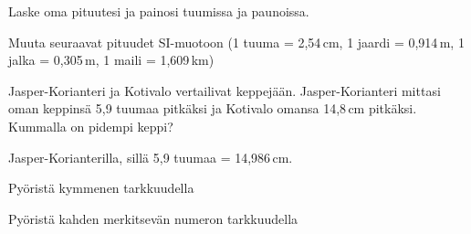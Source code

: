 \begin{tehtavasivu}
\begin{tehtava}
Laske oma pituutesi ja painosi tuumissa ja paunoissa.
\end{tehtava}

\begin{tehtava}
Muuta seuraavat pituudet SI-muotoon (1 tuuma = 2,54\,cm, 1 jaardi = 0,914\,m, 1 jalka = 0,305\,m, 1 maili = 1,609\,km) \\
\begin{alakohdat}
\end{alakohdat}
\begin{vastaus}
\begin{alakohdat}
\end{alakohdat}
\end{vastaus}
\end{tehtava}

\begin{tehtava}
Jasper-Korianteri ja Kotivalo vertailivat keppejään. Jasper-Korianteri mittasi oman keppinsä 5,9 tuumaa pitkäksi ja Kotivalo omansa 14,8\,cm pitkäksi. Kummalla on pidempi keppi?
\begin{vastaus}
Jasper-Korianterilla, sillä 5,9 tuumaa = 14,986\,cm.
\end{vastaus}
\end{tehtava}

\begin{tehtava}
Pyöristä kymmenen tarkkuudella
\begin{alakohdat}
\end{alakohdat}
\begin{vastaus}
\begin{alakohdat}
\end{alakohdat}
\end{vastaus}
\end{tehtava}

\begin{tehtava}
Pyöristä kahden merkitsevän numeron tarkkuudella
\begin{alakohdat}
\end{alakohdat}
\begin{vastaus}
\begin{alakohdat}
\end{alakohdat}
\end{vastaus}
\end{tehtava}


\end{tehtavasivu}
